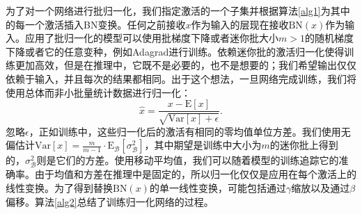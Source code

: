 \documentclass[../main.tex]{subfile}
\begin{document}
为了对一个网络进行批归一化，我们指定激活的一个子集并根据算法\ref{alg1}为其中的每一个激活插入BN变换。任何之前接收$x$作为输入的层现在接收$\text{BN}\left(x\right)$作为输入。应用了批归一化的模型可以使用批梯度下降或者迷你批大小$m>1$的随机梯度下降或者它的任意变种，例如Adagrad\cite{adagrad}进行训练。依赖迷你批的激活归一化使得训练更加高效，但是在推理中，它既不是必要的，也不是想要的；我们希望输出仅仅依赖于输入，并且每次的结果都相同。出于这个想法，一旦网络完成训练，我们将使用总体而非小批量统计数据进行归一化：
\begin{equation*}
    \hat{x} = \frac{x - \text{E}\left[x\right]}{\sqrt{\text{Var}\left[x\right] + \epsilon}}.
\end{equation*}
忽略$\epsilon$，正如训练中，这些归一化后的激活有相同的零均值单位方差。我们使用无偏估计$\text{Var}\left[x\right] = \frac{m}{m-1} \cdot \text{E}_\mathcal{B}\left[ \sigma_\mathcal{B}^2 \right]$，其中期望是训练中大小为$m$的迷你批上得到的，$\sigma_\mathcal{B}^2$则是它们的方差。使用移动平均值，我们可以随着模型的训练追踪它的准确率。由于均值和方差在推理中是固定的，所以归一化仅仅是应用在每个激活上的线性变换。为了得到替换$\text{BN}\left(x\right)$的单一线性变换，可能包括通过$\gamma$缩放以及通过$\beta$偏移。算法\ref{alg2}总结了训练归一化网络的过程。
\end{document}
